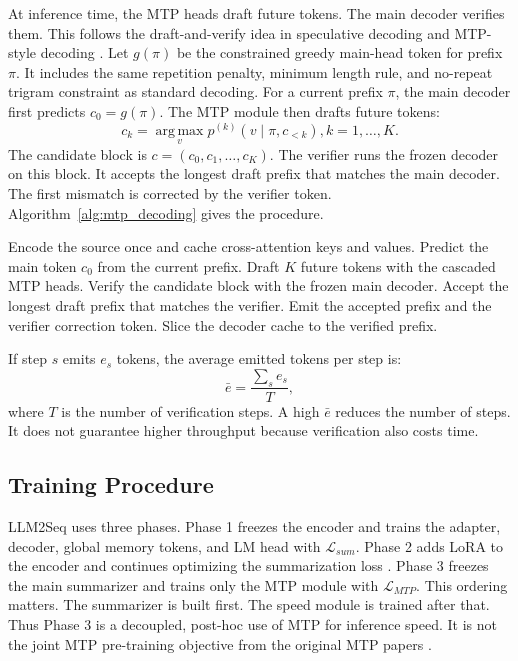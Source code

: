 \documentclass[11pt]{article}
\begin{document}
At inference time, the MTP heads draft future tokens.
The main decoder verifies them.
This follows the draft-and-verify idea in speculative decoding and MTP-style decoding \citep{leviathan2023speculative,gloeckle2024mtp,zhao2026mtpdistill}.
Let $g(\pi)$ be the constrained greedy main-head token for prefix $\pi$.
It includes the same repetition penalty, minimum length rule, and no-repeat trigram constraint as standard decoding.
For a current prefix $\pi$, the main decoder first predicts $c_0=g(\pi)$.
The MTP module then drafts future tokens:
\begin{equation}
c_k=\operatorname*{arg\,max}_{v}
p^{(k)}(v\mid \pi,c_{<k}),
k=1,\ldots,K.
\end{equation}
The candidate block is $c=(c_0,c_1,\ldots,c_K)$.
The verifier runs the frozen decoder on this block.
It accepts the longest draft prefix that matches the main decoder.
The first mismatch is corrected by the verifier token.
Algorithm~\ref{alg:mtp_decoding} gives the procedure.

\begin{algorithm}[H]
\caption{Verified MTP Draft-and-Check Decoding}
\label{alg:mtp_decoding}
\begin{algorithmic}[1]
\State Encode the source once and cache cross-attention keys and values.
\Repeat
    \State Predict the main token $c_0$ from the current prefix.
    \State Draft $K$ future tokens with the cascaded MTP heads.
    \State Verify the candidate block with the frozen main decoder.
    \State Accept the longest draft prefix that matches the verifier.
    \State Emit the accepted prefix and the verifier correction token.
    \State Slice the decoder cache to the verified prefix.
\end{algorithmic}
\end{algorithm}
If step $s$ emits $e_s$ tokens, the average emitted tokens per step is:
\begin{equation}
\bar{e}=\frac{\sum_s e_s}{T},
\end{equation}
where $T$ is the number of verification steps.
A high $\bar{e}$ reduces the number of steps.
It does not guarantee higher throughput because verification also costs time.

\subsection{Training Procedure}

LLM2Seq uses three phases.
Phase 1 freezes the encoder and trains the adapter, decoder, global memory tokens, and LM head with $\mathcal{L}_{sum}$.
Phase 2 adds LoRA to the encoder and continues optimizing the summarization loss \citep{hu2022lora}.
Phase 3 freezes the main summarizer and trains only the MTP module with $\mathcal{L}_{MTP}$.
This ordering matters.
The summarizer is built first.
The speed module is trained after that.
Thus Phase 3 is a decoupled, post-hoc use of MTP for inference speed.
It is not the joint MTP pre-training objective from the original MTP papers \citep{gloeckle2024mtp,zhao2026mtpdistill,deepseekai2024deepseekv3}.
\end{document}
